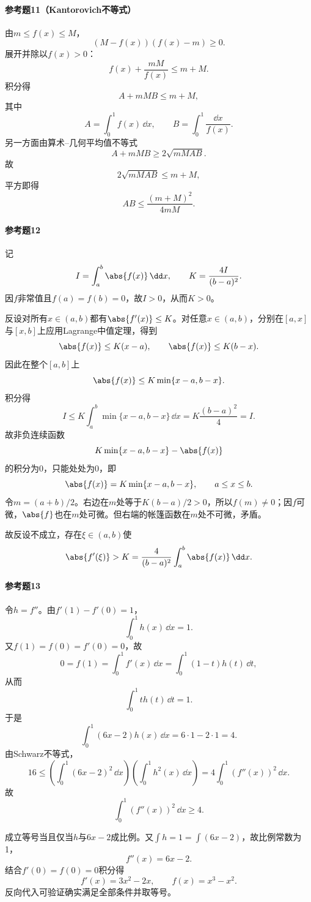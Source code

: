 \paragraph{参考题11（Kantorovich不等式）}
\begin{xsolution}
由$m\le f(x)\le M$，
\[
 (M-f(x))(f(x)-m)\ge0.
\]
展开并除以$f(x)>0$：
\[
 f(x)+\frac{mM}{f(x)}\le m+M.
\]
积分得
\[
 A+mMB\le m+M,
\]
其中
\[
 A=\int_0^1f(x)\,\dd x,
 \qquad B=\int_0^1\frac{\dd x}{f(x)}.
\]
另一方面由算术--几何平均值不等式
\[
 A+mMB\ge2\sqrt{mMAB}.
\]
故
\[
 2\sqrt{mMAB}\le m+M,
\]
平方即得
\[
 \boxed{AB\le\frac{(m+M)^2}{4mM}}.
\]
\end{xsolution}

\paragraph{参考题12}
\begin{xsolution}
记
\[
 I=\int_a^b\abs{f(x)}\,\dd x,
 \qquad K=\frac{4I}{(b-a)^2}.
\]
因$f$非常值且$f(a)=f(b)=0$，故$I>0$，从而$K>0$。

反设对所有$x\in(a,b)$都有$\abs{f'(x)}\le K$。对任意$x\in(a,b)$，分别在$[a,x]$与$[x,b]$上应用Lagrange中值定理，得到
\[
 \abs{f(x)}\le K(x-a),
 \qquad
 \abs{f(x)}\le K(b-x).
\]
因此在整个$[a,b]$上
\[
 \abs{f(x)}\le K\min\{x-a,b-x\}.
\]
积分得
\[
 I\le K\int_a^b\min\{x-a,b-x\}\,\dd x
 =K\frac{(b-a)^2}{4}=I.
\]
故非负连续函数
\[
 K\min\{x-a,b-x\}-\abs{f(x)}
\]
的积分为0，只能处处为0，即
\[
 \abs{f(x)}=K\min\{x-a,b-x\},\qquad a\le x\le b.
\]
令$m=(a+b)/2$。右边在$m$处等于$K(b-a)/2>0$，所以$f(m)\ne0$；因$f$可微，$\abs{f}$也在$m$处可微。但右端的帐篷函数在$m$处不可微，矛盾。

故反设不成立，存在$\xi\in(a,b)$使
\[
 \abs{f'(\xi)}>K
 =\frac4{(b-a)^2}\int_a^b\abs{f(x)}\,\dd x.
\]
\end{xsolution}

\paragraph{参考题13}
\begin{xsolution}
令$h=f''$。由$f'(1)-f'(0)=1$，
\[
 \int_0^1h(x)\,\dd x=1.
\]
又$f(1)=f(0)=f'(0)=0$，故
\[
 0=f(1)=\int_0^1f'(x)\,\dd x
 =\int_0^1(1-t)h(t)\,\dd t,
\]
从而
\[
 \int_0^1t h(t)\,\dd t=1.
\]
于是
\[
 \int_0^1(6x-2)h(x)\,\dd x
 =6\cdot1-2\cdot1=4.
\]
由Schwarz不等式，
\[
 16\le\left(\int_0^1(6x-2)^2\,\dd x\right)
 \left(\int_0^1h^2(x)\,\dd x\right)
 =4\int_0^1(f''(x))^2\,\dd x.
\]
故
\[
 \int_0^1(f''(x))^2\,\dd x\ge4.
\]

成立等号当且仅当$h$与$6x-2$成比例。又$\int h=1=\int(6x-2)$，故比例常数为1，
\[
 f''(x)=6x-2.
\]
结合$f'(0)=f(0)=0$积分得
\[
 f'(x)=3x^2-2x,
 \qquad f(x)=x^3-x^2.
\]
反向代入可验证确实满足全部条件并取等号。
\end{xsolution}

